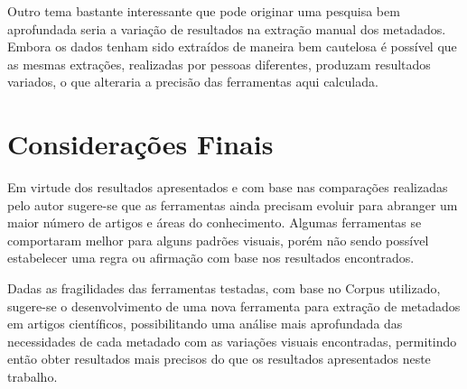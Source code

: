 Outro tema bastante interessante que pode originar uma pesquisa bem aprofundada seria a variação de resultados na extração manual dos metadados. Embora os dados tenham sido extraídos de maneira bem cautelosa é possível que as mesmas extrações, realizadas por pessoas diferentes, produzam resultados variados, o que alteraria a precisão das ferramentas aqui calculada.

\section{Considerações Finais}
\label{sec:final-considerations}

Em virtude dos resultados apresentados e com base nas comparações realizadas pelo autor sugere-se que as ferramentas ainda precisam evoluir para abranger um maior número de artigos e áreas do conhecimento. Algumas ferramentas se comportaram melhor para alguns padrões visuais, porém não sendo possível estabelecer uma regra ou afirmação com base nos resultados encontrados.

Dadas as fragilidades das ferramentas testadas, com base no Corpus utilizado, sugere-se o desenvolvimento de uma nova ferramenta para extração de metadados em artigos científicos, possibilitando uma análise mais aprofundada das necessidades de cada metadado com as variações visuais encontradas, permitindo então obter resultados mais precisos do que os resultados apresentados neste trabalho.

